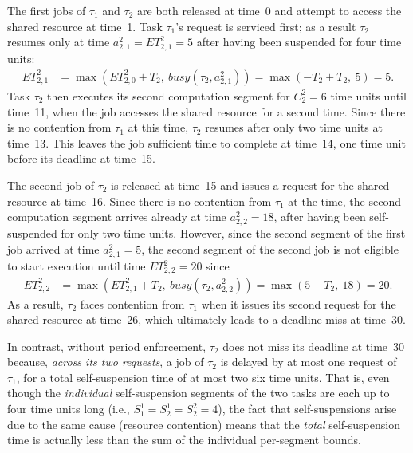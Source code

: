 The first jobs of $\tau_1$ and $\tau_2$ are both released at time~0 and attempt to access the shared resource at time~1. Task $\tau_1$'s request is serviced first; as a result $\tau_2$ resumes only at time $a^2_{2,1} = ET_{2,1}^2 = 5$ after having been suspended for four time units:
\begin{align*}
	ET_{2,1}^2 & = \max\left(ET_{2,0}^2 + T_2,\ \mathit{busy}(\tau_2, a^2_{2,1})\right) =\max(-T_2 + T_2,\ 5) = 5.
\end{align*}
Task $\tau_2$ then executes its second computation segment for $C_2^2 = 6$ time units until time~11, when the job accesses the shared resource for a second time. Since there is no contention from $\tau_1$ at this time, $\tau_2$ resumes after only two time units at time~13. This leaves the job sufficient time to complete at time~14, one time unit before its deadline at time~15.


The second job of $\tau_2$ is released at time~15 and issues a request for the shared resource at time~16. Since there is no contention from $\tau_1$ at the time, the second computation segment arrives already at time $a^2_{2,2} = 18$, after having been self-suspended for only two time units. However, since the second segment of the first job arrived at time $a^2_{2,1} = 5$, the second segment of the second job is not eligible to start execution until time $ET_{2,2}^2 = 20$ since 
\begin{align*}
	ET_{2,2}^2 & = \max\left(ET_{2,1}^2 + T_2,\ \mathit{busy}(\tau_2, a^2_{2,2})\right) =\max(5 + T_2,\ 18) = 20.
\end{align*}
As a result, $\tau_2$ faces contention from $\tau_1$ when it issues its second request for the shared resource at time~26, which ultimately leads to a deadline miss at time~30.

In contrast, without period enforcement, $\tau_2$ does not miss its deadline at time~30 because, \emph{across its two requests}, a job of $\tau_2$ is delayed by at most one request of $\tau_1$, for a total self-suspension time of at most two six time units. That is, even though the \emph{individual} self-suspension segments of the two tasks are each up to four time units long (i.e., $S_1^1 = S_2^1 = S_2^2 = 4$), the fact that self-suspensions arise due to the same cause (resource contention) means that the \emph{total} self-suspension time is actually less than the sum of the individual per-segment bounds.

